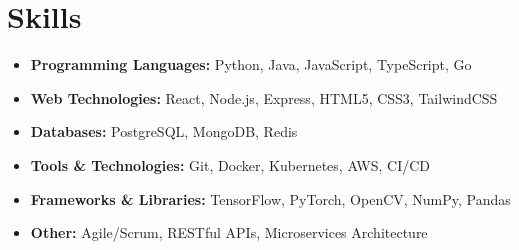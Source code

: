 \section{Skills}
\begin{itemize}[leftmargin=*]
    \small\item{\textbf{Programming Languages:} Python, Java, JavaScript, TypeScript, Go}
    \small\item{\textbf{Web Technologies:} React, Node.js, Express, HTML5, CSS3, TailwindCSS}
    \small\item{\textbf{Databases:} PostgreSQL, MongoDB, Redis}
    \small\item{\textbf{Tools \& Technologies:} Git, Docker, Kubernetes, AWS, CI/CD}
    \small\item{\textbf{Frameworks \& Libraries:} TensorFlow, PyTorch, OpenCV, NumPy, Pandas}
    \small\item{\textbf{Other:} Agile/Scrum, RESTful APIs, Microservices Architecture}
\end{itemize} 